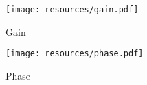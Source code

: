 \FloatBarrier  
\begin{figure} [!htb] 
  \texttt{[image: resources/gain.pdf]}
  \caption{Gain}
  \label{fig:theoplots}
  \hfill
\end{figure}
\FloatBarrier  

\FloatBarrier
\begin{figure} [!htb] 
  \texttt{[image: resources/phase.pdf]}
  \caption{Phase}
  \label{fig:theoplots}
  \endminipage
  \hfill
\end{figure}
\FloatBarrier


